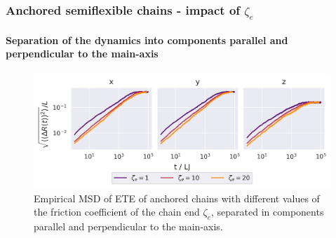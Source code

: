 \documentclass[handout]{beamer}
\begin{document}
\begin{frame}
    \frametitle{Anchored semiflexible chains - impact of $\zeta_e$}
    \framesubtitle{Separation of the dynamics into components parallel and perpendicular to the main-axis}
    \begin{figure}[h]
        \includegraphics[width=11.2cm]{./14+15+16-exp-msd-dim-log.png}
        \caption{
        Empirical MSD of ETE of anchored chains with different values of the friction
        coefficient of the chain end $\zeta_e$, separated in components parallel and 
        perpendicular to the main-axis.
        }
    \end{figure}
\end{frame}
\end{document}
